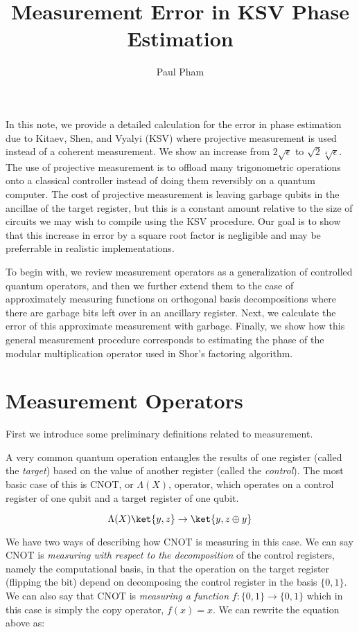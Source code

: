 \documentclass{article}
\title{Measurement Error in KSV Phase Estimation}
\author{Paul Pham}
\begin{document}
\maketitle

In this note, we provide a detailed calculation for the error in
phase estimation due to Kitaev, Shen, and Vyalyi (KSV) where projective
measurement is used instead of a coherent measurement. We show an
increase from $2\sqrt{\epsilon}$ to $\sqrt{2}\sqrt[4]{\epsilon}$. The use
of projective measurement is to offload many trigonometric operations
onto a classical controller instead of doing them reversibly on a quantum
computer. The cost of projective measurement is leaving garbage qubits in
the ancillae of the target register, but this is a constant amount relative to
the size of circuits we may wish to compile using the KSV procedure.
Our goal is to show that this increase in error by a square root
factor is negligible and may be preferrable in realistic implementations.

To begin with, we review measurement operators as a generalization of
controlled quantum operators, and then we further extend them to the case
of approximately measuring functions on orthogonal basis decompositions
where there are garbage bits left over in an ancillary register.
Next, we calculate the error of this approximate measurement with garbage.
Finally, we show how this general measurement procedure corresponds to
estimating the phase of the modular multiplication operator used in
Shor's factoring algorithm.

\section{Measurement Operators}

First we introduce some preliminary definitions related to measurement.

A very common quantum operation entangles the results of one register
(called the \emph{target}) based on the value of another register (called the
\emph{control}). The most basic case of this is CNOT, or $\Lambda(X)$,
operator, which operates
on a control register of one qubit and a target register of one qubit.

\begin{equation}
\Lambda(X)\ket{y,z} \rightarrow \ket{y, z \oplus y}
\end{equation}

We have two ways of describing how CNOT is measuring in this case.
We can say CNOT is \emph{measuring with respect to the decomposition} of
the control registers, namely the computational basis, in that the
operation on the target register (flipping the bit) depend on decomposing the
control register in the basis $\{0,1\}$. We can also say that CNOT is
\emph{measuring a function} $f:\{0,1\} \rightarrow \{0,1\}$ which in this
case is simply the copy operator, $f(x) = x$. We can rewrite the equation
above as:
\end{document}
